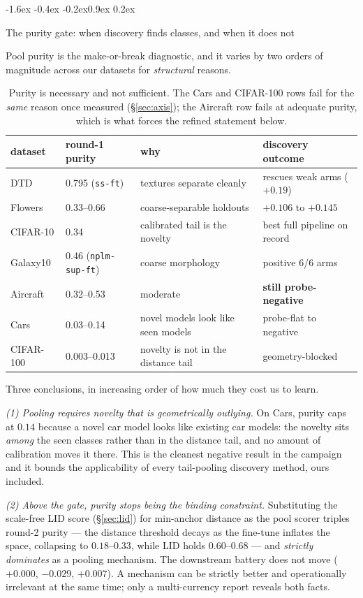 \documentclass{article}
\makeatletter
\renewcommand\subsection{\@startsection{subsection}{2}{\z@}%
  {-1.6ex \@plus -0.4ex \@minus -0.2ex}{0.9ex \@plus 0.2ex}%
  {\normalsize\bf\raggedright}}
\makeatother
\begin{document}
\subsection{The purity gate: when discovery finds classes, and when it does not}
\label{sec:purity-gate}

Pool purity is the make-or-break diagnostic, and it varies by two orders of
magnitude across our datasets for \emph{structural} reasons.

\begin{table}[t]\centering\small
\begin{tabular}{llll}
\toprule
dataset & round-1 purity & why & discovery outcome \\
\midrule
DTD & 0.795 (\texttt{ss-ft}) & textures separate cleanly & rescues weak arms ($+0.19$) \\
Flowers & 0.33--0.66 & coarse-separable holdouts & $+0.106$ to $+0.145$ \\
CIFAR-10 & 0.34 & calibrated tail is the novelty & best full pipeline on record \\
Galaxy10 & 0.46 (\texttt{nplm-sup-ft}) & coarse morphology & positive 6/6 arms \\
Aircraft & 0.32--0.53 & moderate & \textbf{still probe-negative} \\
Cars & 0.03--0.14 & novel models look like seen models & probe-flat to negative \\
CIFAR-100 & 0.003--0.013 & novelty is not in the distance tail & geometry-blocked \\
\bottomrule
\end{tabular}
\caption{Purity is necessary and not sufficient. The Cars and CIFAR-100 rows fail for the
\emph{same} reason once measured (\S\ref{sec:axis}); the Aircraft row fails at
adequate purity, which is what forces the refined statement below.}
\label{tab:purity}
\end{table}

Three conclusions, in increasing order of how much they cost us to learn.

\emph{(1) Pooling requires novelty that is geometrically outlying.} On Cars,
purity caps at $0.14$ because a novel car model looks like existing car
models: the novelty sits \emph{among} the seen classes rather than in the
distance tail, and no amount of calibration moves it there. This is the
cleanest negative result in the campaign and it bounds the applicability of
every tail-pooling discovery method, ours included.

\emph{(2) Above the gate, purity stops being the binding constraint.}
Substituting the scale-free LID score (\S\ref{sec:lid}) for min-anchor
distance as the pool scorer triples round-2 purity --- the distance threshold
decays as the fine-tune inflates the space, collapsing to $0.18$--$0.33$, while
LID holds $0.60$--$0.68$ --- and \emph{strictly dominates} as a pooling
mechanism. The downstream battery does not move ($+0.000$, $-0.029$,
$+0.007$). A mechanism can be strictly better and operationally irrelevant at
the same time; only a multi-currency report reveals both facts.
\end{document}
